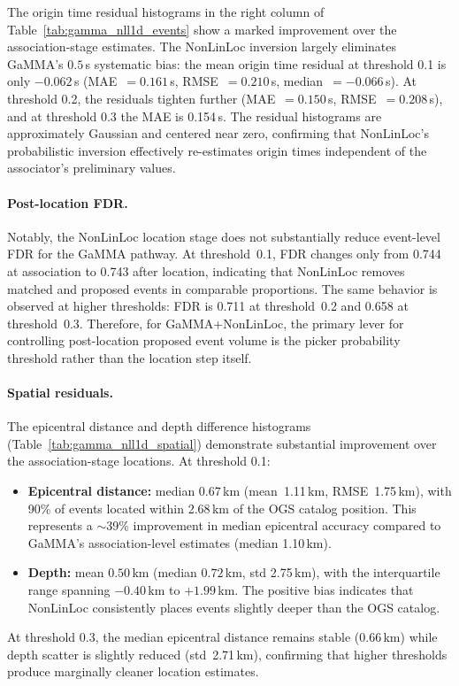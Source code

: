 The origin time residual histograms in the right column of
Table~\ref{tab:gamma_nll1d_events} show a marked improvement over the
association-stage estimates. The NonLinLoc inversion largely eliminates GaMMA's
$0.5$\,s systematic bias: the mean origin time residual at threshold 0.1 is
only $-0.062$\,s (MAE~$= 0.161$\,s, RMSE~$= 0.210$\,s, median~$= -0.066$\,s).
At threshold 0.2, the residuals tighten further (MAE~$= 0.150$\,s,
RMSE~$= 0.208$\,s), and at threshold 0.3 the MAE is 0.154\,s. The residual
histograms are approximately Gaussian and centered near zero, confirming that
NonLinLoc's probabilistic inversion effectively re-estimates origin times
independent of the associator's preliminary values.

\paragraph{Post-location FDR.}
Notably, the NonLinLoc location stage does not substantially reduce event-level
\ac{FDR} for the GaMMA pathway. At threshold~0.1, \ac{FDR} changes only from
0.744 at association to 0.743 after location, indicating that NonLinLoc
removes matched and proposed events in comparable proportions. The same
behavior is observed at higher thresholds: \ac{FDR} is 0.711 at threshold~0.2
and 0.658 at threshold~0.3. Therefore, for GaMMA+NonLinLoc, the primary lever
for controlling post-location proposed event volume is the picker probability
threshold rather than the location step itself.

\paragraph{Spatial residuals.}
The epicentral distance and depth difference histograms
(Table~\ref{tab:gamma_nll1d_spatial}) demonstrate substantial improvement over
the association-stage locations. At threshold 0.1:
\begin{itemize}
  \item \textbf{Epicentral distance:} median 0.67\,km (mean~1.11\,km,
    RMSE~1.75\,km), with 90\% of events located within 2.68\,km of the OGS
    catalog position. This represents a $\sim$39\% improvement in median
    epicentral accuracy compared to GaMMA's association-level estimates (median
    1.10\,km).
  \item \textbf{Depth:} mean $0.50$\,km (median $0.72$\,km, std 2.75\,km),
    with the interquartile range spanning $-0.40$\,km to $+1.99$\,km. The
    positive bias indicates that NonLinLoc consistently places events slightly
    deeper than the OGS catalog.
\end{itemize}
At threshold 0.3, the median epicentral distance remains stable (0.66\,km)
while depth scatter is slightly reduced (std~2.71\,km), confirming that higher
thresholds produce marginally cleaner location estimates.

